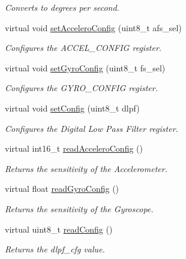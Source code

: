 \begin{DoxyCompactItemize}
\begin{DoxyCompactList}\small\item\em Converts to degrees per second. \end{DoxyCompactList}\item 
virtual void \hyperlink{classMpu6050_a3cfca1ea37e1d1bc4aebba7ceedb5a28}{set\+Accelero\+Config} (uint8\+\_\+t afs\+\_\+sel)
\begin{DoxyCompactList}\small\item\em Configures the A\+C\+C\+E\+L\+\_\+\+C\+O\+N\+F\+IG register. \end{DoxyCompactList}\item 
virtual void \hyperlink{classMpu6050_aef89bc30955f1db83eed1bb0dc9ec175}{set\+Gyro\+Config} (uint8\+\_\+t fs\+\_\+sel)
\begin{DoxyCompactList}\small\item\em Configures the G\+Y\+R\+O\+\_\+\+C\+O\+N\+F\+IG register. \end{DoxyCompactList}\item 
virtual void \hyperlink{classMpu6050_a39dc9a11251acf10c9c3b24e84ec8a57}{set\+Config} (uint8\+\_\+t dlpf)
\begin{DoxyCompactList}\small\item\em Configures the Digital Low Pass Filter register. \end{DoxyCompactList}\item 
virtual int16\+\_\+t \hyperlink{classMpu6050_a2f4ca51ed27c06d62b8060841c62ec4b}{read\+Accelero\+Config} ()
\begin{DoxyCompactList}\small\item\em Returns the sensitivity of the Accelerometer. \end{DoxyCompactList}\item 
virtual float \hyperlink{classMpu6050_a1a6e1a3452ee6d6d667c5ae425326772}{read\+Gyro\+Config} ()
\begin{DoxyCompactList}\small\item\em Returns the sensitivity of the Gyroscope. \end{DoxyCompactList}\item 
virtual uint8\+\_\+t \hyperlink{classMpu6050_acae18af6f85523362243bb61cf865586}{read\+Config} ()
\begin{DoxyCompactList}\small\item\em Returns the dlpf\+\_\+cfg value. \end{DoxyCompactList}\end{DoxyCompactItemize}
